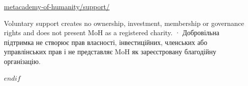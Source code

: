 \documentclass[10pt,a4paper]{article}
\begin{document}
\vfill
{\fontsize{8}{11}\selectfont\color{MoHMuted}\href{https://d4ttara.github.io/metacademy-of-humanity/support/}{metacademy-of-humanity/support/}\par}
\vspace{3mm}
{\fontsize{7.5}{10}\selectfont\color{MoHMuted}Voluntary support creates no ownership, investment, membership or governance rights and does not present MoH as a registered charity. · Добровільна підтримка не створює прав власності, інвестиційних, членських або управлінських прав і не представляє MoH як зареєстровану благодійну організацію.\par}
$endif$
\end{document}
